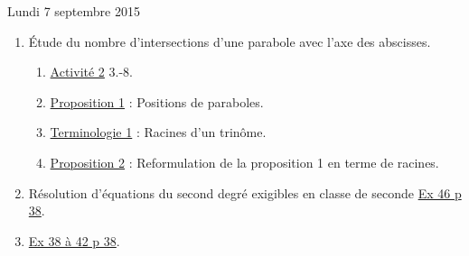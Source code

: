 \documentclass[a4paper,11pt]{article}
\theoremstyle{break}
\begin{document}
  Lundi 7 septembre 2015
  \begin{enumerate}
    
    \item \'Etude du nombre d'intersections d'une parabole avec l'axe des abscisses.
    \begin{enumerate}
      \item 
      \href{https://github.com/mathlorgues/math1sd1516/blob/master/20150907/activite.pdf}
   {Activité 2} 3.-8.
      \item 
      \href{https://github.com/mathlorgues/math1sd1516/blob/master/20150907/propositions.pdf}
   {Proposition 1} : Positions de paraboles.
      \item 
      \href{https://github.com/mathlorgues/math1sd1516/blob/master/20150907/definitions.pdf}
   {Terminologie 1} : Racines d'un trinôme.
      \item 
      \href{https://github.com/mathlorgues/math1sd1516/blob/master/20150907/propositions.pdf}
   {Proposition 2} : Reformulation de la proposition 1 en terme de racines.
    \end{enumerate}
    \item Résolution d'équations du second degré exigibles en classe de seconde 
    \href{https://github.com/mathlorgues/math1sd1516/blob/master/20150907/46p38.jpg}
   {Ex 46 p 38}.
    \item 
    \href{https://github.com/mathlorgues/math1sd1516/blob/master/20150907/38-42p38.jpg}
   {Ex 38 à 42 p 38}.
    
  \end{enumerate}
  
\end{document}
